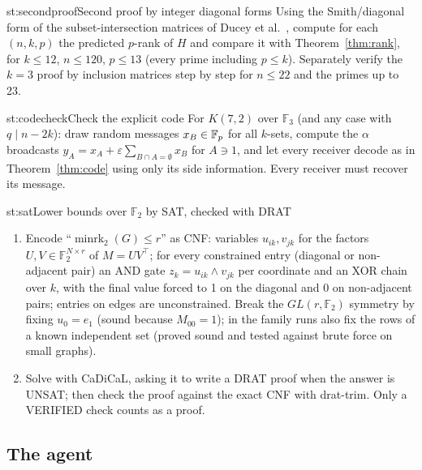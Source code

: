 \begin{step}{st:secondproof}{Second proof by integer diagonal forms}
Using the Smith/diagonal form of the subset-intersection matrices of Ducey et al.~\cite{ducey}, compute for each
$(n,k,p)$ the predicted $p$-rank of $H$ and compare it with Theorem~\ref{thm:rank}, for $k\le12$, $n\le120$, $p\le13$
(every prime including $p\le k$). Separately verify the $k=3$ proof by inclusion matrices step by step for $n\le22$
and the primes up to 23.
\end{step}

\begin{step}{st:codecheck}{Check the explicit code}
For $K(7,2)$ over $\mathbb{F}_3$ (and any case with $q\mid n-2k$): draw random messages $x_B\in\mathbb{F}_p$ for all $k$-sets,
compute the $\alpha$ broadcasts $y_A=x_A+\varepsilon\sum_{B\cap A=\emptyset}x_B$ for $A\ni1$, and let every receiver
decode as in Theorem~\ref{thm:code} using only its side information. Every receiver must recover its message.
\end{step}

\begin{step}{st:sat}{Lower bounds over $\mathbb{F}_2$ by SAT, checked with DRAT}
\begin{enumerate}
  \item Encode ``$\operatorname{minrk}_2(G)\le r$'' as CNF: variables $u_{ik},v_{jk}$ for the factors $U,V\in
  \mathbb{F}_2^{N\times r}$ of $M=UV^\top$; for every constrained entry (diagonal or non-adjacent pair) an AND gate
  $z_k=u_{ik}\wedge v_{jk}$ per coordinate and an XOR chain over $k$, with the final value forced to 1 on the diagonal
  and 0 on non-adjacent pairs; entries on edges are unconstrained. Break the $GL(r,\mathbb{F}_2)$ symmetry by fixing
  $u_0=e_1$ (sound because $M_{00}=1$); in the family runs also fix the rows of a known independent set (proved sound
  and tested against brute force on small graphs).
  \item Solve with CaDiCaL, asking it to write a DRAT proof when the answer is UNSAT; then check the proof against the
  exact CNF with drat-trim. Only a VERIFIED check counts as a proof.
\end{enumerate}
\end{step}

\subsection{The agent}

